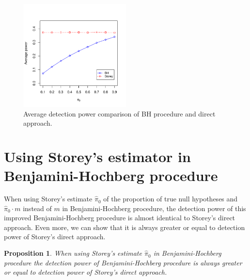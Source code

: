 \documentclass[10pt]{article}
\newtheorem{proposition}[theorem]{Proposition}
\begin{document}
\begin{figure}[H]
	\centering
	\includegraphics[width=0.5\textwidth]{power.pdf}
	\caption{Average detection power comparison of BH procedure and direct approach.}
	\label{fig: power}	
\end{figure}

\section{Using Storey's estimator in Benjamini-Hochberg procedure} \label{sec: 2nd}

When using Storey's estimate $\widehat{\pi}_{0}$ of the proportion of true null hypotheses and $\widehat{\pi}_{0} \cdot m$ instead of $m$ in Benjamini-Hochberg procedure, the detection power of this improved Benjamini-Hochberg procedure is almost identical to Storey's direct approach. Even more, we can show that it is always greater or equal to detection power of Storey's direct approach.

\begin{proposition}
When using Storey's estimate $\widehat{\pi}_{0}$ in Benjamini-Hochberg procedure the detection power of Benjamini-Hochberg procedure is always greater or equal to detection power of Storey's direct approach.
\end{proposition}
\end{document}
